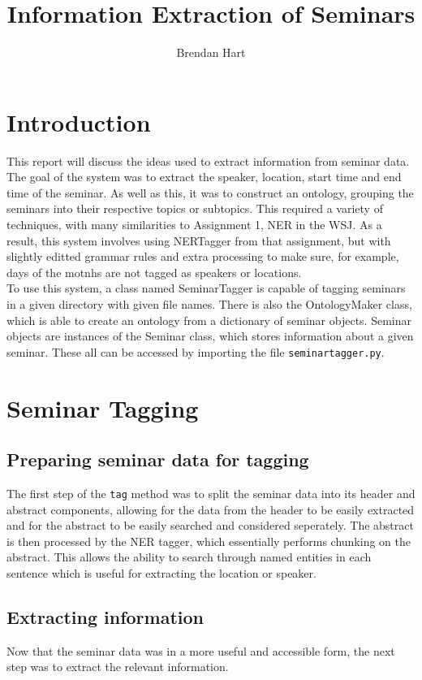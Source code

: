 \documentclass[10pt]{article}
\title{Information Extraction of Seminars}
\author{Brendan Hart}
\begin{document}
\maketitle

\begin{multicols}{2}

\section{Introduction}
This report will discuss the ideas used to extract information from seminar data. The goal of the system was to extract the speaker, location, start time and end time of the seminar. As well as this, it was to construct an ontology, grouping the seminars into their respective topics or subtopics. This required a variety of techniques, with many similarities to Assignment 1, NER in the WSJ. As a result, this system involves using NERTagger from that assignment, but with slightly editted grammar rules and extra processing to make sure, for example, days of the motnhs are not tagged as speakers or locations.\\To use this system, a class named SeminarTagger is capable of tagging seminars in a given directory with given file names. There is also the OntologyMaker class, which is able to create an ontology from a dictionary of seminar objects. Seminar objects are instances of the Seminar class, which stores information about a given seminar. These all can be accessed by importing the file {{\tt seminartagger.py}}.

\section{Seminar Tagging}
\subsection{Preparing seminar data for tagging}
The first step of the {{\tt tag}} method was to split the seminar data into its header and abstract components, allowing for the data from the header to be easily extracted and for the abstract to be easily searched and considered seperately. The abstract is then processed by the NER tagger, which essentially performs chunking on the abstract. This allows the ability to search through named entities in each sentence which is useful for extracting the location or speaker.
\subsection{Extracting information}
Now that the seminar data was in a more useful and accessible form, the next step was to extract the relevant information.

\end{multicols}
\end{document}

